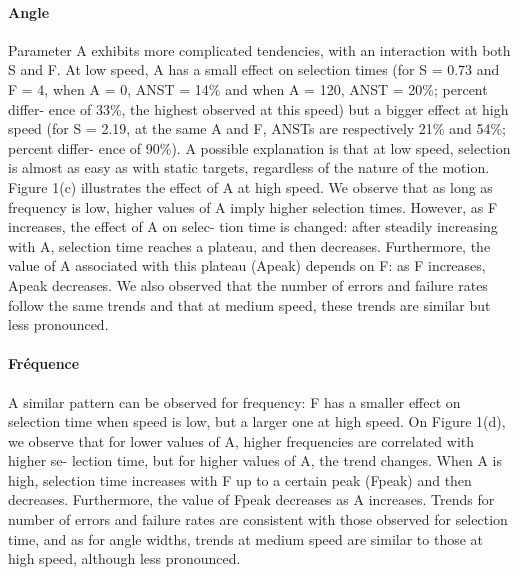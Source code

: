 \paragraph{Angle}
Parameter A exhibits more complicated tendencies, with an interaction with
both S and F. At low speed, A has a small effect on selection times (for S = 0.73 and
F = 4, when A = 0, ANST = 14\%{} and when A = 120, ANST = 20\%{}; percent differ-
ence of 33\%{}, the highest observed at this speed) but a bigger effect at high speed (for
S = 2.19, at the same A and F, ANSTs are respectively 21\%{} and 54\%{}; percent differ-
ence of 90\%{}). A possible explanation is that at low speed, selection is almost as easy
as with static targets, regardless of the nature of the motion. Figure 1(c) illustrates the
effect of A at high speed. We observe that as long as frequency is low, higher values
of A imply higher selection times. However, as F increases, the effect of A on selec-
tion time is changed: after steadily increasing with A, selection time reaches a plateau,
and then decreases. Furthermore, the value of A associated with this plateau (Apeak)
depends on F: as F increases, Apeak decreases.
We also observed that the number of errors and failure rates follow the same trends
and that at medium speed, these trends are similar but less pronounced.

\paragraph{Fréquence}
A similar pattern can be observed for frequency: F has a smaller effect on
selection time when speed is low, but a larger one at high speed. On Figure 1(d), we
observe that for lower values of A, higher frequencies are correlated with higher se-
lection time, but for higher values of A, the trend changes. When A is high, selection
time increases with F up to a certain peak (Fpeak) and then decreases. Furthermore, the
value of Fpeak decreases as A increases. Trends for number of errors and failure rates
are consistent with those observed for selection time, and as for angle widths, trends
at medium speed are similar to those at high speed, although less pronounced.

